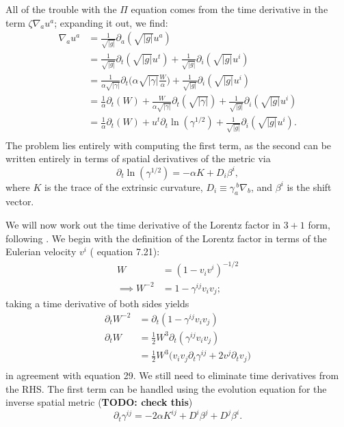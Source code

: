 \documentclass[12pt]{article}
\numberwithin{equation}{section}
\begin{document}
All of the trouble with the $\Pi$ equation comes from the time derivative in the term $\zeta \nabla_a u^a$; expanding it out, we find:
\begin{equation}
\begin{aligned}
\nabla_a u^a &= \frac{1}{\sqrt{|g|}} \partial_{a} (\sqrt{|g|} u^a) \\
&= \frac{1}{\sqrt{|g|}} \partial_{t} (\sqrt{|g|} u^t) + \frac{1}{\sqrt{|g|}} \partial_{i} (\sqrt{|g|} u^i) \\
&= \frac{1}{\alpha \sqrt{|\gamma|}} \partial_{t} \Big( \alpha \sqrt{|\gamma|} \frac{W}{\alpha} \Big) + \frac{1}{\sqrt{|g|}} \partial_{i} (\sqrt{|g|} u^i) \\
&= \frac{1}{\alpha} \partial_{t} ( W ) + \frac{W}{\alpha \sqrt{|\gamma|}} \partial_{t} ( \sqrt{|\gamma|} ) + \frac{1}{\sqrt{|g|}} \partial_{i} (\sqrt{|g|} u^i) \\
&= \frac{1}{\alpha} \partial_{t} ( W ) + u^t \partial_{t} \ln( \gamma^{1/2} ) + \frac{1}{\sqrt{|g|}} \partial_{i} (\sqrt{|g|} u^i). \\
\end{aligned}
\end{equation}
The problem lies entirely with computing the first term, as the second can be written entirely in terms of spatial derivatives of the metric via
\begin{equation}
\partial_t \ln(\gamma^{1/2}) = -\alpha K + D_i \beta^i,
\end{equation}
where $K$ is the trace of the extrinsic curvature, $D_i \equiv \gamma_{a}^{~b} \nabla_{b}$, and $\beta^i$ is the shift vector.

We will now work out the time derivative of the Lorentz factor in $3+1$ form, following \cite{Servignat22}.
We begin with the definition of the Lorentz factor in terms of the Eulerian velocity $v^i$ (\cite{RezzollaZanotti} equation 7.21): 
\begin{equation}
\begin{aligned}
W &= (1 - v_i v^i)^{-1/2} \\
\implies W^{-2} &= 1 - \gamma^{ij} v_i v_j;
\end{aligned}
\end{equation}
taking a time derivative of both sides yields
\begin{equation}
\begin{aligned}
\partial_t W^{-2} &= \partial_t ( 1 - \gamma^{ij} v_i v_j ) \\
\partial_t W &= \frac{1}{2} W^3 \partial_t ( \gamma^{ij} v_i v_j ) \\
&= \frac{1}{2} W^3 \Big( v_i v_j \partial_t \gamma^{ij} + 2 v^j \partial_t v_j \Big) \\
\end{aligned}
\end{equation}
in agreement with \cite{Servignat22} equation 29.
We still need to eliminate time derivatives from the RHS.
The first term can be handled using the evolution equation for the inverse spatial metric (\textbf{TODO: check this})
\begin{equation}
\partial_t \gamma^{ij} = -2 \alpha K^{ij} + D^i \beta^j + D^j \beta^i.
\end{equation}
\end{document}
